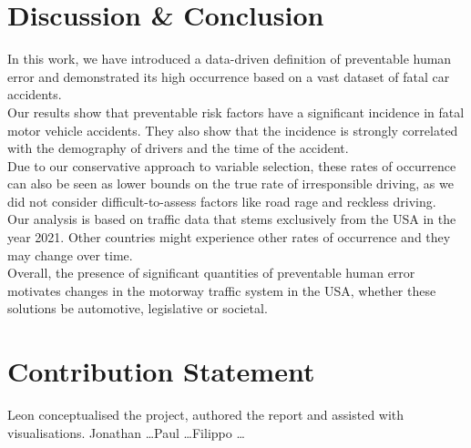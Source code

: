 \documentclass{article}
\theoremstyle{plain}
\theoremstyle{definition}
\theoremstyle{remark}
\begin{document}
\section{Discussion \& Conclusion}\label{sec:conclusion}

In this work, we have introduced a data-driven definition of preventable human error and demonstrated its high occurrence based on a vast dataset of fatal car accidents.
\\
Our results show that preventable risk factors have a significant incidence in fatal motor vehicle accidents. They also show that the incidence is strongly correlated with the demography of drivers and the time of the accident.
\\
Due to our conservative approach to variable selection, these rates of occurrence can also be seen as lower bounds on the true rate of irresponsible driving, as we did not consider difficult-to-assess factors like road rage and reckless driving.
\\
Our analysis is based on traffic data that stems exclusively from the USA in the year 2021. Other countries might experience other rates of occurrence and they may change over time.
\\
Overall, the presence of significant quantities of preventable human error motivates changes in the motorway traffic system in the USA, whether these solutions be automotive, legislative or societal. 


\section*{Contribution Statement}

Leon conceptualised the project, authored the report and assisted with visualisations. Jonathan \ldots Paul \ldots Filippo \ldots
\\


\end{document}
